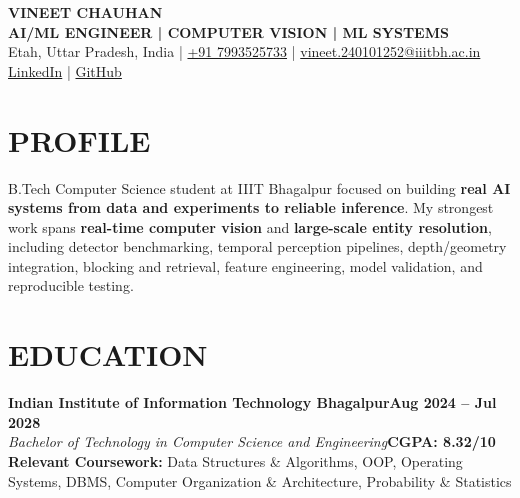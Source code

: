 \documentclass[letterpaper,11pt]{article}
\begin{document}
\begin{center}
    {\Huge\bfseries VINEET CHAUHAN}\\[3pt]
    {\normalsize\bfseries\color{Accent} AI/ML ENGINEER \;|\; COMPUTER VISION \;|\; ML SYSTEMS}\\[5pt]
    \small
    Etah, Uttar Pradesh, India
    \;|\;
    \href{tel:+917993525733}{+91 7993525733}
    \;|\;
    \href{mailto:vineet.240101252@iiitbh.ac.in}{vineet.240101252@iiitbh.ac.in}\\[2pt]
    \href{https://www.linkedin.com/in/vineet-chauhan-8a79ab37b/}{LinkedIn}
    \;|\;
    \href{https://github.com/Vineet-2028}{GitHub}
\end{center}
\vspace{-6pt}

\section{PROFILE}
\small\justifying
B.Tech Computer Science student at IIIT Bhagalpur focused on building \textbf{real AI systems from data and experiments to reliable inference}. My strongest work spans \textbf{real-time computer vision} and \textbf{large-scale entity resolution}, including detector benchmarking, temporal perception pipelines, depth/geometry integration, blocking and retrieval, feature engineering, model validation, and reproducible testing.
\vspace{-2pt}

\section{EDUCATION}
\textbf{Indian Institute of Information Technology Bhagalpur}\hfill\textbf{Aug 2024 -- Jul 2028}\\[1pt]
\textit{Bachelor of Technology in Computer Science and Engineering}\hfill\textbf{CGPA: 8.32/10}\\[2pt]
\small\textbf{Relevant Coursework:} Data Structures \& Algorithms, OOP, Operating Systems, DBMS, Computer Organization \& Architecture, Probability \& Statistics
\vspace{-2pt}
\end{document}
